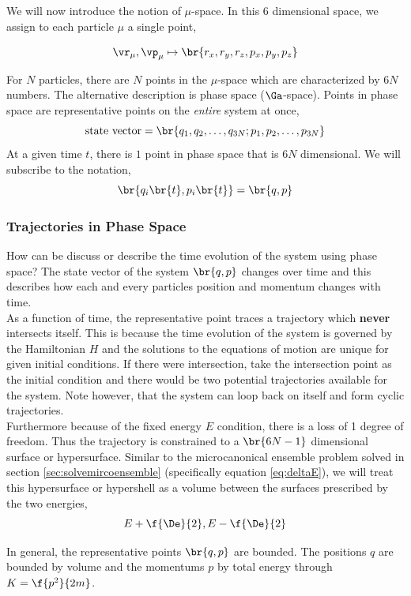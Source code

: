 \documentclass{article}
\begin{document}

We will now introduce the notion of $\mu$-space. In this $6$ dimensional space, we assign to each particle $\mu$ a single point,

\[ \vr_\mu , \vp_\mu \mapsto \br{r_x, r_y, r_z, p_x, p_y, p_z} \]

For $N$ particles, there are $N$ points in the $\mu$-space which are characterized by $6N$ numbers. The alternative description is phase space ($\Ga$-space). Points in phase space are representative points on the \textit{entire} system at once,
\[ \text{state vector} = \br{q_1, q_2, \ldots , q_{3N} ; p_1, p_2, \ldots , p_{3N}} \]
At a given time $t$, there is $1$ point in phase space that is $6N$ dimensional. We will subscribe to the notation,
\[ \br{q_i\br{t}, p_i\br{t}} = \br{q,p} \]

\subsubsection{Trajectories in Phase Space}
How can be discuss or describe the time evolution of the system using phase space? The state vector of the system $\br{q,p}$ changes over time and this describes how each and every particles position and momentum changes with time.\\

As a function of time, the representative point traces a trajectory which \textbf{never} intersects itself. This is because the time evolution of the system is governed by the Hamiltonian $H$ and the solutions to the equations of motion are unique for given initial conditions. If there were intersection, take the intersection point as the initial condition and there would be two potential trajectories available for the system. Note however, that the system can loop back on itself and form cyclic trajectories. \\

Furthermore because of the fixed energy $E$ condition, there is a loss of 1 degree of freedom. Thus the trajectory is constrained to a $\br{6N-1}$ dimensional surface or hypersurface. Similar to the microcanonical ensemble problem solved in section \ref{sec:solvemircoensemble} (specifically equation \eqref{eq:deltaE}), we will treat this hypersurface or hypershell as a volume between the surfaces prescribed by the two energies,
\[ E + \f{\De}{2}, E - \f{\De}{2} \]

In general, the representative points $\br{q,p}$ are bounded. The positions $q$ are bounded by volume and the momentums $p$ by total energy through $K = \f{p^2}{2m}$.\\
\end{document}
